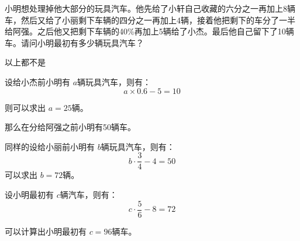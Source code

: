\documentclass[answers]{exam}
\begin{document}
\begin{questions}
	\question
	小明想处理掉他大部分的玩具汽车。他先给了小轩自己收藏的六分之一再加上8辆车，然后又给了小丽剩下车辆的四分之一再加上4辆，接着他把剩下的车分了一半给阿强。之后他又把剩下车辆的40\%再加上5辆给了小杰。最后他自己留下了10辆车。请问小明最初有多少辆玩具汽车？

	\begin{oneparchoices}
		    \choice 以上都不是
	\end{oneparchoices}

	\begin{solution}
		设给小杰前小明有 \( a \)辆玩具汽车，则有：
		\begin{equation*}
			a \times 0.6 - 5 = 10
		\end{equation*}

		则可以求出 \( a = 25 \)辆。

		那么在分给阿强之前小明有50辆车。

		同样的设给小丽前小明有 \( b \)辆玩具汽车，则有：
		\begin{equation*}
			b \cdot \frac{3}{4} - 4 = 50
		\end{equation*}
		可以求出 \( b=72 \)辆。

		设小明最初有 \( c \)辆汽车，则有：
		\begin{equation*}
			c \cdot \frac{5}{6} - 8 = 72
		\end{equation*}

		可以计算出小明最初有 \( c=96 \)辆车。

	\end{solution}

\end{questions}
\end{document}
